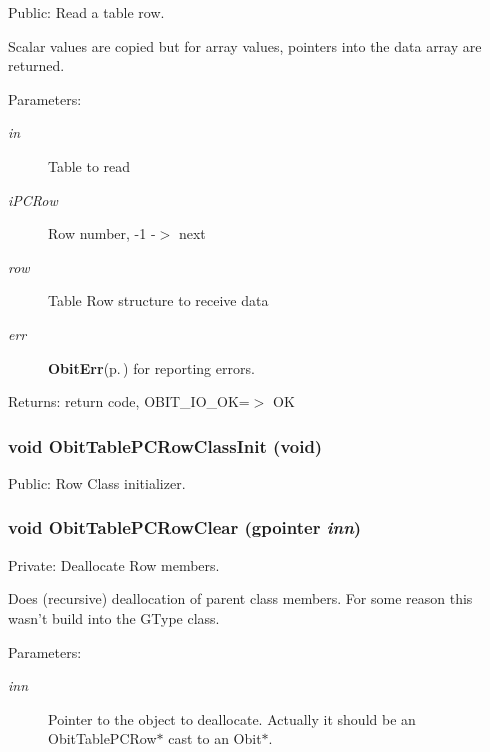 Public: Read a table row. 

Scalar values are copied but for array values, pointers into the data array are returned. \begin{Desc}
\item[Parameters:]
\begin{description}
\item[{\em in}]Table to read \item[{\em i\-PCRow}]Row number, -1 -$>$ next \item[{\em row}]Table Row structure to receive data \item[{\em err}]{\bf Obit\-Err}{\rm (p.\,\pageref{structObitErr})} for reporting errors. \end{description}
\end{Desc}
\begin{Desc}
\item[Returns:]return code, OBIT\_\-IO\_\-OK=$>$ OK \end{Desc}
\subsubsection{\setlength{\rightskip}{0pt plus 5cm}void Obit\-Table\-PCRow\-Class\-Init (void)}\label{ObitTablePC_8c_a26}


Public: Row Class initializer. 

\subsubsection{\setlength{\rightskip}{0pt plus 5cm}void Obit\-Table\-PCRow\-Clear (gpointer {\em inn})}\label{ObitTablePC_8c_a7}


Private: Deallocate Row members. 

Does (recursive) deallocation of parent class members. For some reason this wasn't build into the GType class. \begin{Desc}
\item[Parameters:]
\begin{description}
\item[{\em inn}]Pointer to the object to deallocate. Actually it should be an Obit\-Table\-PCRow$\ast$ cast to an Obit$\ast$. \end{description}
\end{Desc}
